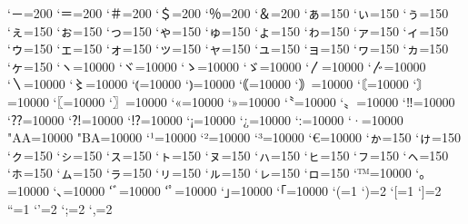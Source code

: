 \prebreakpenalty`－=200%
\prebreakpenalty`＝=200
\postbreakpenalty`＃=200
\postbreakpenalty`＄=200
\prebreakpenalty`％=200
\prebreakpenalty`＆=200
\prebreakpenalty`ぁ=150
\prebreakpenalty`ぃ=150
\prebreakpenalty`ぅ=150
\prebreakpenalty`ぇ=150
\prebreakpenalty`ぉ=150
\prebreakpenalty`っ=150
\prebreakpenalty`ゃ=150
\prebreakpenalty`ゅ=150
\prebreakpenalty`ょ=150
\prebreakpenalty`ゎ=150%
\prebreakpenalty`ァ=150
\prebreakpenalty`ィ=150
\prebreakpenalty`ゥ=150
\prebreakpenalty`ェ=150
\prebreakpenalty`ォ=150
\prebreakpenalty`ッ=150
\prebreakpenalty`ャ=150
\prebreakpenalty`ュ=150
\prebreakpenalty`ョ=150
\prebreakpenalty`ヮ=150%
\prebreakpenalty`ヵ=150%
\prebreakpenalty`ヶ=150%
\prebreakpenalty`ヽ=10000
\prebreakpenalty`ヾ=10000
\prebreakpenalty`ゝ=10000
\prebreakpenalty`ゞ=10000
\prebreakpenalty`〳=10000
\prebreakpenalty`〴=10000
\prebreakpenalty`〵=10000
\prebreakpenalty`〻=10000
\postbreakpenalty`⦅=10000
\prebreakpenalty`⦆=10000
\postbreakpenalty`｟=10000
\prebreakpenalty`｠=10000
\postbreakpenalty`〘=10000
\prebreakpenalty`〙=10000
\postbreakpenalty`〖=10000
\prebreakpenalty`〗=10000
\postbreakpenalty`«=10000
\prebreakpenalty`»=10000
\postbreakpenalty`〝=10000
\prebreakpenalty`〟=10000
\prebreakpenalty`‼=10000
\prebreakpenalty`⁇=10000
\prebreakpenalty`⁈=10000
\prebreakpenalty`⁉=10000
\postbreakpenalty`¡=10000
\postbreakpenalty`¿=10000
\prebreakpenalty`ː=10000
\prebreakpenalty`·=10000
\prebreakpenalty"AA=10000
\prebreakpenalty"BA=10000
\prebreakpenalty`¹=10000
\prebreakpenalty`²=10000
\prebreakpenalty`³=10000
\postbreakpenalty`€=10000
\prebreakpenalty`ゕ=150
\prebreakpenalty`ゖ=150
\prebreakpenalty`ㇰ=150
\prebreakpenalty`ㇱ=150
\prebreakpenalty`ㇲ=150
\prebreakpenalty`ㇳ=150
\prebreakpenalty`ㇴ=150
\prebreakpenalty`ㇵ=150
\prebreakpenalty`ㇶ=150
\prebreakpenalty`ㇷ=150
\prebreakpenalty`ㇸ=150
\prebreakpenalty`ㇹ=150
\prebreakpenalty`ㇺ=150
\prebreakpenalty`ㇻ=150
\prebreakpenalty`ㇼ=150
\prebreakpenalty`ㇽ=150
\prebreakpenalty`ㇾ=150
\prebreakpenalty`ㇿ=150
\prebreakpenalty`™=10000
\prebreakpenalty`｡=10000
\prebreakpenalty`､=10000
\prebreakpenalty`ﾞ=10000
\prebreakpenalty`ﾟ=10000
\prebreakpenalty`｣=10000
\postbreakpenalty`｢=10000
\xspcode`(=1
\xspcode`)=2
\xspcode`[=1
\xspcode`]=2
\xspcode``=1
\xspcode`'=2
\xspcode`;=2
\xspcode`,=2
